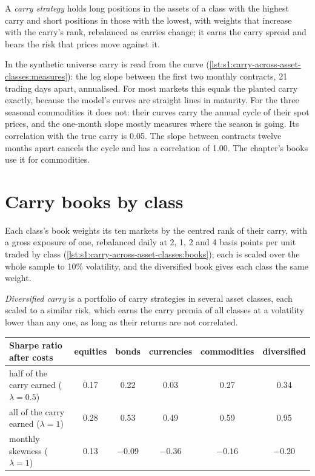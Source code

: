 \begin{definition}\label{def:s1:carry-across-asset-classes:carry}
A \emph{carry strategy} holds long positions in the assets of a class with the highest carry and short positions in those with
the lowest, with weights that increase with the carry's rank, rebalanced as carries change; it earns the carry spread and bears the risk that prices
move against it.
\end{definition}

In the synthetic universe carry is read from the curve (\cref{lst:s1:carry-across-asset-classes:measures}): the log slope between the first two monthly
contracts, 21 trading days apart, annualised. For most markets this equals the planted carry exactly, because the model's curves are straight lines in
maturity. For the three seasonal commodities it does not: their curves carry the annual cycle of their spot prices, and the one-month slope mostly
measures where the season is going. Its correlation with the true carry is 0.05. The slope between contracts twelve months apart cancels the cycle and
has a correlation of 1.00. The chapter's books use it for commodities.

\section{Carry books by class}

Each class's book weights its ten markets by the centred rank of their carry, with a gross exposure of one, rebalanced daily at 2, 1, 2 and 4 basis
points per unit traded by class (\cref{lst:s1:carry-across-asset-classes:books}); each is scaled over the whole sample to 10\% volatility, and the
diversified book gives each class the same weight.

\begin{definition}\label{def:s1:carry-across-asset-classes:diversified}
\emph{Diversified carry} is a portfolio of carry strategies in several asset classes, each scaled to a similar risk, which
earns the carry premia of all classes at a volatility lower than any one, as long as their returns are not correlated.
\end{definition}

\begin{center}
\small
\begin{tabular}{@{}lccccc@{}}
\toprule
Sharpe ratio after costs & equities & bonds & currencies & commodities & diversified\\
\midrule
half of the carry earned ($\lambda = 0.5$) & 0.17 & 0.22 & 0.03 & 0.27 & 0.34\\
all of the carry earned ($\lambda = 1$) & 0.28 & 0.53 & 0.49 & 0.59 & 0.95\\
\midrule
monthly skewness ($\lambda = 1$) & 0.13 & $-0.09$ & $-0.36$ & $-0.16$ & $-0.20$\\
\bottomrule
\end{tabular}
\end{center}

